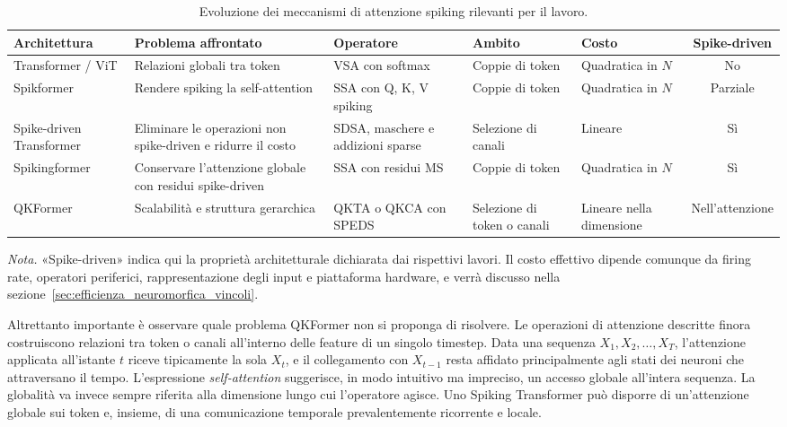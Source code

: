 \begin{table}[t]
\centering
\small
\renewcommand{\arraystretch}{1.2}
\caption[Evoluzione dei meccanismi di attenzione spiking]{Evoluzione dei meccanismi di attenzione spiking rilevanti per il lavoro.}
\label{tab:evoluzione_attenzione_spiking}
\begin{adjustbox}{max width=\textwidth}
\begin{tabular}{@{}>{\raggedright\arraybackslash}p{2.6cm} >{\raggedright\arraybackslash}p{3.3cm} >{\raggedright\arraybackslash}p{2.6cm} >{\raggedright\arraybackslash}p{2.1cm} >{\raggedright\arraybackslash}p{2.1cm} c@{}}
\hline
\textbf{Architettura} & \textbf{Problema affrontato} & \textbf{Operatore} & \textbf{Ambito} & \textbf{Costo} & \textbf{Spike-driven} \\
\hline
Transformer / ViT & Relazioni globali tra token & VSA con softmax & Coppie di token & Quadratica in $N$ & No \\
Spikformer & Rendere spiking la self-attention & SSA con Q, K, V spiking & Coppie di token & Quadratica in $N$ & Parziale \\
Spike-driven Transformer & Eliminare le operazioni non spike-driven e ridurre il costo & SDSA, maschere e addizioni sparse & Selezione di canali & Lineare & Sì \\
Spikingformer & Conservare l'attenzione globale con residui spike-driven & SSA con residui MS & Coppie di token & Quadratica in $N$ & Sì \\
QKFormer & Scalabilità e struttura gerarchica & QKTA o QKCA con SPEDS & Selezione di token o canali & Lineare nella dimensione & Nell'attenzione \\
\hline
\end{tabular}
\end{adjustbox}
\vspace{0.4em}
\begin{flushleft}
\footnotesize
\emph{Nota.} «Spike-driven» indica qui la proprietà architetturale dichiarata dai rispettivi lavori. Il costo effettivo dipende comunque da firing rate, operatori periferici, rappresentazione degli input e piattaforma hardware, e verrà discusso nella sezione~\ref{sec:efficienza_neuromorfica_vincoli}.
\end{flushleft}
\end{table}

Altrettanto importante è osservare quale problema QKFormer non si proponga di risolvere. Le operazioni di attenzione descritte finora costruiscono relazioni tra token o canali all'interno delle feature di un singolo timestep. Data una sequenza $X_1,X_2,\dots,X_T$, l'attenzione applicata all'istante $t$ riceve tipicamente la sola $X_t$, e il collegamento con $X_{t-1}$ resta affidato principalmente agli stati dei neuroni che attraversano il tempo. L'espressione \emph{self-attention} suggerisce, in modo intuitivo ma impreciso, un accesso globale all'intera sequenza. La globalità va invece sempre riferita alla dimensione lungo cui l'operatore agisce. Uno Spiking Transformer può disporre di un'attenzione globale sui token e, insieme, di una comunicazione temporale prevalentemente ricorrente e locale.

